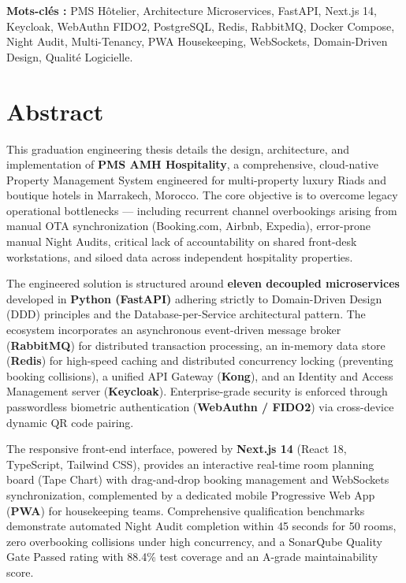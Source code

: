 \documentclass[12pt,a4paper,oneside]{report}
\begin{document}
\vspace{0.8cm}
\noindent\textbf{Mots-clés :} PMS Hôtelier, Architecture Microservices, FastAPI, Next.js 14, Keycloak, WebAuthn FIDO2, PostgreSQL, Redis, RabbitMQ, Docker Compose, Night Audit, Multi-Tenancy, PWA Housekeeping, WebSockets, Domain-Driven Design, Qualité Logicielle.

\clearpage

\chapter*{Abstract}

This graduation engineering thesis details the design, architecture, and implementation of \textbf{PMS AMH Hospitality}, a comprehensive, cloud-native Property Management System engineered for multi-property luxury Riads and boutique hotels in Marrakech, Morocco. The core objective is to overcome legacy operational bottlenecks --- including recurrent channel overbookings arising from manual OTA synchronization (Booking.com, Airbnb, Expedia), error-prone manual Night Audits, critical lack of accountability on shared front-desk workstations, and siloed data across independent hospitality properties.

The engineered solution is structured around \textbf{eleven decoupled microservices} developed in \textbf{Python (FastAPI)} adhering strictly to Domain-Driven Design (DDD) principles and the Database-per-Service architectural pattern. The ecosystem incorporates an asynchronous event-driven message broker (\textbf{RabbitMQ}) for distributed transaction processing, an in-memory data store (\textbf{Redis}) for high-speed caching and distributed concurrency locking (preventing booking collisions), a unified API Gateway (\textbf{Kong}), and an Identity and Access Management server (\textbf{Keycloak}). Enterprise-grade security is enforced through passwordless biometric authentication (\textbf{WebAuthn / FIDO2}) via cross-device dynamic QR code pairing.

The responsive front-end interface, powered by \textbf{Next.js 14} (React 18, TypeScript, Tailwind CSS), provides an interactive real-time room planning board (Tape Chart) with drag-and-drop booking management and WebSockets synchronization, complemented by a dedicated mobile Progressive Web App (\textbf{PWA}) for housekeeping teams. Comprehensive qualification benchmarks demonstrate automated Night Audit completion within 45 seconds for 50 rooms, zero overbooking collisions under high concurrency, and a SonarQube Quality Gate Passed rating with 88.4\% test coverage and an A-grade maintainability score.
\end{document}
